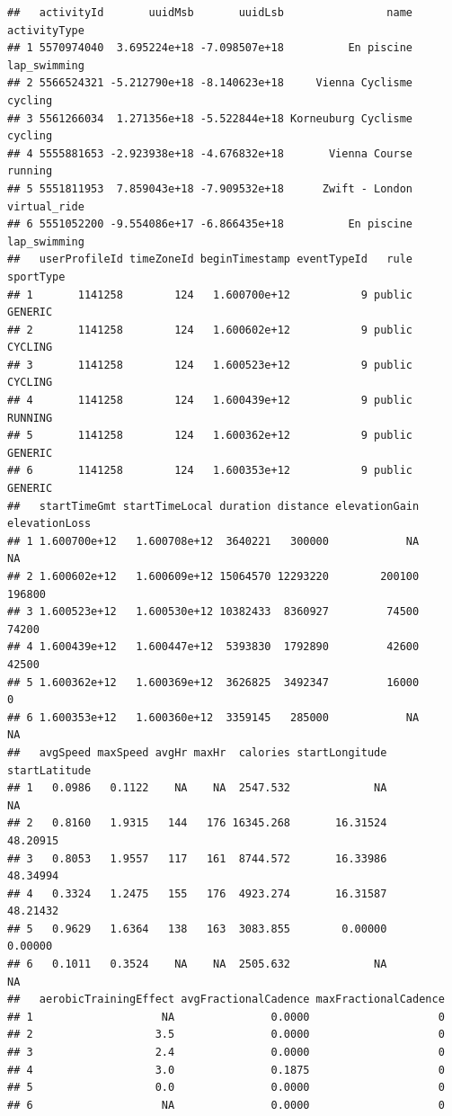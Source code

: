 \documentclass[
]{book}
\begin{document}
\begin{verbatim}
##   activityId       uuidMsb       uuidLsb                name activityType
## 1 5570974040  3.695224e+18 -7.098507e+18          En piscine lap_swimming
## 2 5566524321 -5.212790e+18 -8.140623e+18     Vienna Cyclisme      cycling
## 3 5561266034  1.271356e+18 -5.522844e+18 Korneuburg Cyclisme      cycling
## 4 5555881653 -2.923938e+18 -4.676832e+18       Vienna Course      running
## 5 5551811953  7.859043e+18 -7.909532e+18      Zwift - London virtual_ride
## 6 5551052200 -9.554086e+17 -6.866435e+18          En piscine lap_swimming
##   userProfileId timeZoneId beginTimestamp eventTypeId   rule sportType
## 1       1141258        124   1.600700e+12           9 public   GENERIC
## 2       1141258        124   1.600602e+12           9 public   CYCLING
## 3       1141258        124   1.600523e+12           9 public   CYCLING
## 4       1141258        124   1.600439e+12           9 public   RUNNING
## 5       1141258        124   1.600362e+12           9 public   GENERIC
## 6       1141258        124   1.600353e+12           9 public   GENERIC
##   startTimeGmt startTimeLocal duration distance elevationGain elevationLoss
## 1 1.600700e+12   1.600708e+12  3640221   300000            NA            NA
## 2 1.600602e+12   1.600609e+12 15064570 12293220        200100        196800
## 3 1.600523e+12   1.600530e+12 10382433  8360927         74500         74200
## 4 1.600439e+12   1.600447e+12  5393830  1792890         42600         42500
## 5 1.600362e+12   1.600369e+12  3626825  3492347         16000             0
## 6 1.600353e+12   1.600360e+12  3359145   285000            NA            NA
##   avgSpeed maxSpeed avgHr maxHr  calories startLongitude startLatitude
## 1   0.0986   0.1122    NA    NA  2547.532             NA            NA
## 2   0.8160   1.9315   144   176 16345.268       16.31524      48.20915
## 3   0.8053   1.9557   117   161  8744.572       16.33986      48.34994
## 4   0.3324   1.2475   155   176  4923.274       16.31587      48.21432
## 5   0.9629   1.6364   138   163  3083.855        0.00000       0.00000
## 6   0.1011   0.3524    NA    NA  2505.632             NA            NA
##   aerobicTrainingEffect avgFractionalCadence maxFractionalCadence
## 1                    NA               0.0000                    0
## 2                   3.5               0.0000                    0
## 3                   2.4               0.0000                    0
## 4                   3.0               0.1875                    0
## 5                   0.0               0.0000                    0
## 6                    NA               0.0000                    0

\end{verbatim}
\end{document}
